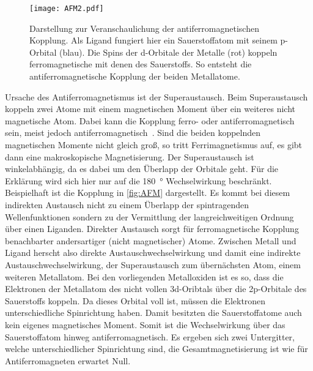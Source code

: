         \begin{figure}
            \centering
            \texttt{[image: AFM2.pdf]}
            \caption{Darstellung zur Veranschaulichung der antiferromagnetischen Kopplung.
            Als Ligand fungiert hier ein Sauerstoffatom mit seinem p-Orbital (blau).
            Die Spins der d-Orbitale der Metalle (rot) koppeln ferromagnetische mit denen des Sauerstoffs.
            So entsteht die antiferromagnetische Kopplung der beiden Metallatome.}
            \label{fig:AFM}
        \end{figure}
        Ursache des Antiferromagnetismus ist der Superaustausch.
        Beim Superaustausch koppeln zwei Atome mit einem magnetischen Moment über ein weiteres nicht magnetische Atom. 
        Dabei kann die Kopplung ferro- oder antiferromagnetisch sein, meist jedoch antiferromagnetisch~\cite{AFM_1}.
        Sind die beiden koppelnden magnetischen Momente nicht gleich groß, so tritt Ferrimagnetismus auf, es gibt dann eine makroskopische Magnetisierung.
        Der Superaustausch ist winkelabhängig, da es dabei um den Überlapp der Orbitale geht.
        Für die Erklärung wird sich hier nur auf die \SI{180}{\degree} Wechselwirkung beschränkt.
        Beispielhaft ist die Kopplung in \autoref{fig:AFM} dargestellt.
        Es kommt bei diesem indirekten Austausch nicht zu einem Überlapp der spintragenden Wellenfunktionen sondern zu der Vermittlung der langreichweitigen Ordnung über einen Liganden.
        Direkter Austausch sorgt für ferromagnetische Kopplung benachbarter andersartiger (nicht magnetischer) Atome.
        Zwischen Metall und Ligand herscht also direkte Austauschwechselwirkung und damit eine indirekte Austauschwechselwirkung, der Superaustausch zum übernächsten Atom, einem weiteren Metallatom.
        Bei den vorliegenden Metalloxiden ist es so, dass die Elektronen der Metallatom des nicht vollen 3d-Oribtals über die 2p-Orbitale des Sauerstoffs koppeln.
        Da dieses Orbital voll ist, müssen die Elektronen unterschiedliche Spinrichtung haben.
        Damit besitzten die Sauerstoffatome auch kein eigenes magnetisches Moment.
        Somit ist die Wechselwirkung über das Sauerstoffatom hinweg antiferromagnetisch.
        Es ergeben sich zwei Untergitter, welche unterschiedlicher Spinrichtung sind, die Gesamtmagnetisierung ist wie für Antiferromagneten erwartet Null.
        
